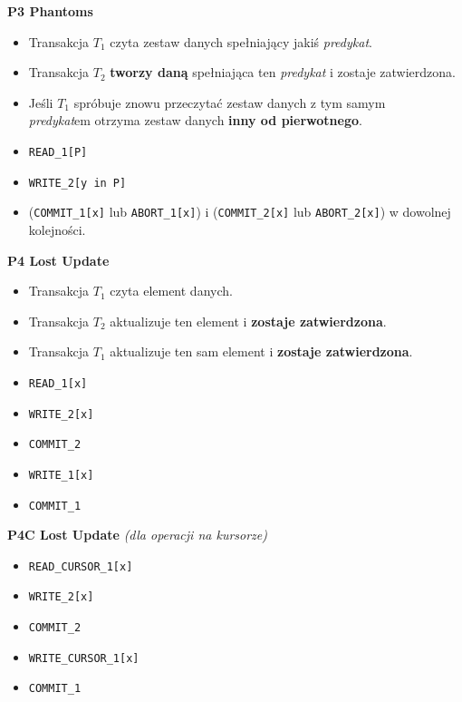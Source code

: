 \documentclass[a5paper,6pt]{article}
\begin{document}
    \textbf{P3 Phantoms}
    \begin{itemize}
        \item Transakcja $T_1$ czyta zestaw danych spełniający jakiś
              \textit{predykat}.
        \item Transakcja $T_2$ \textbf{tworzy daną} spełniająca ten
              \textit{predykat} i zostaje zatwierdzona.
        \item Jeśli $T_1$ spróbuje znowu przeczytać zestaw danych z tym samym\\
              \textit{predykat}em otrzyma zestaw danych
              \textbf{inny od pierwotnego}.
        \item \texttt{READ\_1[P]}
        \item \texttt{WRITE\_2[y in P]}
        \item (\texttt{COMMIT\_1[x]} lub \texttt{ABORT\_1[x]}) i
              (\texttt{COMMIT\_2[x]} lub \texttt{ABORT\_2[x]})
              w dowolnej kolejności.
    \end{itemize}

    \textbf{P4 Lost Update}
    \begin{itemize}
        \item Transakcja $T_1$ czyta element danych.
        \item Transakcja $T_2$ aktualizuje ten element i
              \textbf{zostaje zatwierdzona}.
        \item Transakcja $T_1$ aktualizuje ten sam element i
              \textbf{zostaje zatwierdzona}.
        \item \texttt{READ\_1[x]}
        \item \texttt{WRITE\_2[x]}
        \item \texttt{COMMIT\_2}
        \item \texttt{WRITE\_1[x]}
        \item \texttt{COMMIT\_1}
    \end{itemize}

    \textbf{P4C Lost Update} \textit{(dla operacji na kursorze)}
    \begin{itemize}
        \item \texttt{READ\_CURSOR\_1[x]}
        \item \texttt{WRITE\_2[x]}
        \item \texttt{COMMIT\_2}
        \item \texttt{WRITE\_CURSOR\_1[x]}
        \item \texttt{COMMIT\_1}
    \end{itemize}
\end{document}
